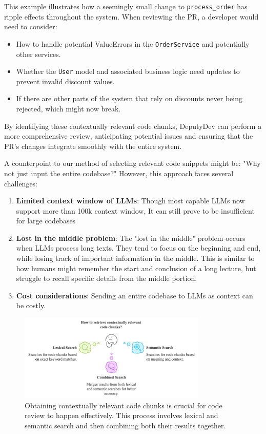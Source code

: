 This example illustrates how a seemingly small change to \texttt{process\_order} has ripple effects throughout the system. When reviewing the PR, a developer would need to consider:

\begin{itemize}
    \item How to handle potential ValueErrors in the \texttt{OrderService} and potentially other services.
    \item Whether the \texttt{User} model and associated business logic need updates to prevent invalid discount values.
    \item If there are other parts of the system that rely on discounts never being rejected, which might now break.
\end{itemize}

By identifying these contextually relevant code chunks, DeputyDev can perform a more comprehensive review, anticipating potential issues and ensuring that the PR's changes integrate smoothly with the entire system.

A counterpoint to our method of selecting relevant code snippets might be: "Why not just input the entire codebase?" However, this approach faces several challenges:

\begin{enumerate}
    \item \textbf{Limited context window of LLMs}: Though most capable LLMs now support more than 100k context window, It can still prove to be insufficient for large codebases
    \item \textbf{Lost in the middle problem}: The "lost in the middle" problem occurs when LLMs process long texts. They tend to focus on the beginning and end, while losing track of important information in the middle. This is similar to how humans might remember the start and conclusion of a long lecture, but struggle to recall specific details from the middle portion.
    \item \textbf{Cost considerations}: Sending an entire codebase to LLMs as context can be costly.
\end{enumerate}

\begin{figure}[htbp]
    \centering
    \includegraphics[width=0.8\textwidth]
    {Figures/search.png}
    \caption{Obtaining contextually relevant code chunks is crucial for code review to happen effectively. This process involves lexical and semantic search and then combining both their results together.
}
    \label{fig:DeputyDev-search}
\end{figure}